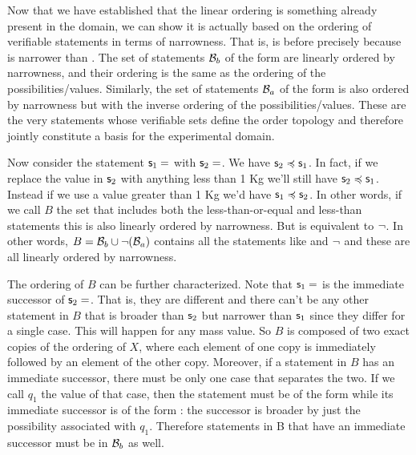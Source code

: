 \documentclass[11pt,letterpaper,fleqn]{memoir} %
\begin{document}
Now that we have established that the linear ordering is something already present in the domain, we can show it is actually based on the ordering of verifiable statements in terms of narrowness. That is,  is before  precisely because  is narrower than . The set of statements $\mathcal{B}_b$ of the form  are linearly ordered by narrowness, and their ordering is the same as the ordering of the possibilities/values. Similarly, the set of statements $\mathcal{B}_a$ of the form  is also ordered by narrowness but with the inverse ordering of the possibilities/values. These are the very statements whose verifiable sets define the order topology and therefore jointly constitute a basis for the experimental domain.

Now consider the statement $\mathsf{s}_1=$ with $\mathsf{s}_2=$. We have $\mathsf{s}_2 \preccurlyeq \mathsf{s}_1$. In fact, if we replace the value in $\mathsf{s}_2$ with anything less than 1 Kg we'll still have $\mathsf{s}_2 \preccurlyeq \mathsf{s}_1$. Instead if we use a value greater than 1 Kg we'd have $\mathsf{s}_1 \preccurlyeq \mathsf{s}_2$. In other words, if we call $B$ the set that includes both the less-than-or-equal and less-than statements this is also linearly ordered by narrowness. But  is equivalent to $\neg$. In other words, $B=\mathcal{B}_b \cup \neg(\mathcal{B}_a)$ contains all the statements like  and $\neg$ and these are all linearly ordered by narrowness.

The ordering of $B$ can be further characterized. Note that $\mathsf{s}_1=$ is the immediate successor of $\mathsf{s}_2=$. That is, they are different and there can't be any other statement in $B$ that is broader than $\mathsf{s}_2$ but narrower than $\mathsf{s}_1$ since they differ for a single case. This will happen for any mass value. So $B$ is composed of two exact copies of the ordering of $X$, where each element of one copy is immediately followed by an element of the other copy. Moreover, if a statement in $B$ has an immediate successor, there must be only one case that separates the two. If we call $q_1$ the value of that case, then the statement must be of the form  while its immediate successor is of the form : the successor is broader by just the possibility associated with $q_1$. Therefore statements in B that have an immediate successor must be in $\mathcal{B}_b$ as well.
\end{document}
